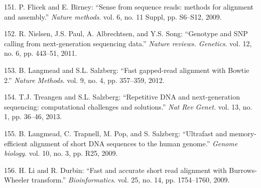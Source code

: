 \documentclass[12pt,a4paper,twoside]{ugathesis}
\theoremstyle{definition}
\theoremstyle{definition}
\theoremstyle{definition}
\theoremstyle{remark}
\begin{document}
\hypertarget{ref-Flicek2009}{}
151. P. Flicek and E. Birney: ``Sense from sequence reads: methods for
alignment and assembly.'' \emph{Nature methods}. vol. 6, no. 11 Suppl,
pp. S6--S12, 2009.

\hypertarget{ref-Nielsen2011}{}
152. R. Nielsen, J.S. Paul, A. Albrechtsen, and Y.S. Song: ``Genotype
and SNP calling from next-generation sequencing data.'' \emph{Nature
reviews. Genetics}. vol. 12, no. 6, pp. 443--51, 2011.

\hypertarget{ref-Langmead2012}{}
153. B. Langmead and S.L. Salzberg: ``Fast gapped-read alignment with
Bowtie 2.'' \emph{Nature Methods}. vol. 9, no. 4, pp. 357--359, 2012.

\hypertarget{ref-Treangen2013}{}
154. T.J. Treangen and S.L. Salzberg: ``Repetitive DNA and
next-generation sequencing: computational challenges and solutions.''
\emph{Nat Rev Genet.} vol. 13, no. 1, pp. 36--46, 2013.

\hypertarget{ref-Langmead2009}{}
155. B. Langmead, C. Trapnell, M. Pop, and S. Salzberg: ``Ultrafast and
memory-efficient alignment of short DNA sequences to the human genome.''
\emph{Genome biology}. vol. 10, no. 3, pp. R25, 2009.

\hypertarget{ref-Li2009a}{}
156. H. Li and R. Durbin: ``Fast and accurate short read alignment with
Burrows-Wheeler transform.'' \emph{Bioinformatics}. vol. 25, no. 14, pp.
1754--1760, 2009.
\end{document}
